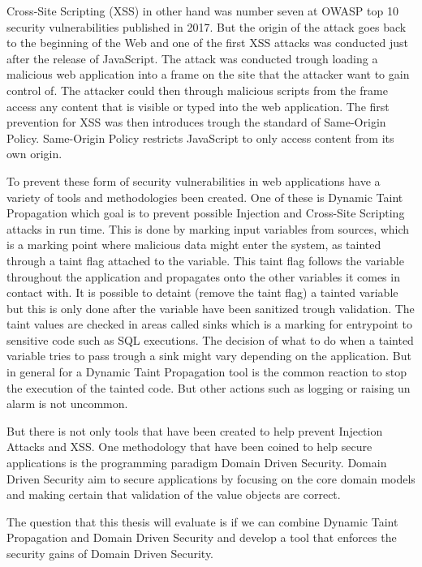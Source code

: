 \documentclass{../kththesis}
\begin{document}
Cross-Site Scripting (XSS) in other hand was number seven at OWASP top 10 security vulnerabilities published in 2017. \parencite{OWASP2017} But the origin of the attack goes back to the beginning of the Web and one of the first XSS attacks was conducted just after the release of JavaScript. The attack was conducted trough loading a malicious web application into a frame on the site that the attacker want to gain control of. The attacker could then through malicious scripts from the frame access any content that is visible or typed into the web application. The first prevention for XSS was then introduces trough the standard of Same-Origin Policy. Same-Origin Policy restricts JavaScript to only access content from its own origin. \parencite{FogieSeth2007Xacs, w3csop} 

To prevent these form of security vulnerabilities in web applications have a variety of tools and methodologies been created. One of these is Dynamic Taint Propagation which goal is to prevent possible Injection and Cross-Site Scripting attacks in run time. This is done by marking input variables from sources, which is a marking point where malicious data might enter the system, as tainted through a taint flag attached to the variable. This taint flag follows the variable throughout the application and propagates onto the other variables it comes in contact with. It is possible to detaint (remove the taint flag) a tainted variable but this is only done after the variable have been sanitized trough validation. The taint values are checked in areas called sinks which is a marking for entrypoint to sensitive code such as SQL executions. \parencite{Pan2015, Venkataramani2008} The decision of what to do when a tainted variable tries to pass trough a sink might vary depending on the application. But in general for a Dynamic Taint Propagation tool is the common reaction to stop the execution of the tainted code. But other actions such as logging or raising un alarm is not uncommon. 

But there is not only tools that have been created to help prevent Injection Attacks and XSS. One methodology that have been coined to help secure applications is the programming paradigm Domain Driven Security. Domain Driven Security aim to secure applications by focusing on the core domain models and making certain that validation of the value objects are correct. \parencite{Wilander2009, Johnsson2009}

The question that this thesis will evaluate is if we can combine Dynamic Taint Propagation and Domain Driven Security and develop a tool that enforces the security gains of Domain Driven Security.
\end{document}
